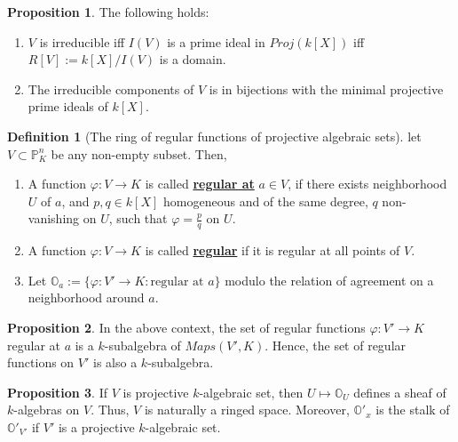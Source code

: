 \documentclass{article}
\theoremstyle{definition}
\theoremstyle{definition}
\newtheorem{definition}{Definition}[theorem]
\theoremstyle{definition}
\theoremstyle{definition}
\newtheorem{proposition}{Proposition}[theorem]
\theoremstyle{definition}
\theoremstyle{definition}
\theoremstyle{definition}
\begin{document}
\begin{tcolorbox}[colback=blue!5!white,colframe=blue!30!white]
\begin{proposition}
The following holds:
\begin{enumerate}
    \item $V$ is irreducible iff $I(V)$ is a prime ideal in $Proj(k[X])$ iff $R[V]:=k[X]/I(V)$ is a domain. 
    \item The irreducible components of $V$ is in bijections with the minimal projective prime ideals of $k[X]$. 
\end{enumerate}
\end{proposition}
\end{tcolorbox}


\begin{tcolorbox}[colback=purple!5!white,colframe=purple!75!black]
\begin{definition}[The ring of regular functions of projective algebraic sets]
let $V\subset \mathbb{P}^n_K$ be any non-empty subset. Then, 
\begin{enumerate}
    \item A function $\varphi: V\to K$ is called \underline{\textbf{regular at}}  $a\in V$, if there exists neighborhood $U$ of $a$, and $p,q\in k[X]$ homogeneous and of the same degree, $q$ non-vanishing on $U$, such that $\varphi=\frac{p}{q}$ on $U$.
    \item A function $\varphi: V\to K$ is called \underline{\textbf{regular}} if it is regular at all points of $V$.
    \item Let $\mathbb{O}_a:=\{ \varphi: V'\to K: \textrm{regular at } a \}$ modulo the relation of agreement on a neighborhood around $a$. 
\end{enumerate}
\end{definition}
\end{tcolorbox}


\begin{tcolorbox}[colback=blue!5!white,colframe=blue!30!white]
\begin{proposition}
In the above context, the set of regular functions $\varphi: V'\to K$ regular at $a$ is a $k$-subalgebra of $Maps(V',K)$. Hence, the set of regular functions on $V'$ is also a $k$-subalgebra.
\end{proposition}
\end{tcolorbox}


\begin{tcolorbox}[colback=blue!5!white,colframe=blue!30!white]
\begin{proposition}
If $V$ is projective $k$-algebraic set, then $U\mapsto \mathbb{O}_U$ defines a sheaf of $k$-algebras on $V$. Thus, $V$ is naturally a ringed space. Moreover, $\mathbb{O}'_x$ is the stalk of $\mathbb{O}'_{V'}$ if $V'$ is a projective $k$-algebraic set.
\end{proposition}
\end{tcolorbox}
\end{document}
